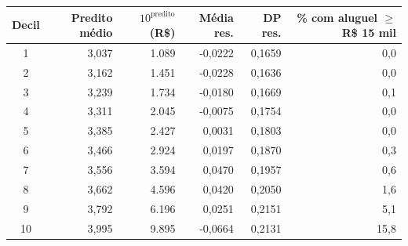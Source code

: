 \begin{tabular}{crrrrr}
\toprule
Decil & Predito médio & $10^{\text{predito}}$ (R\$) & Média res. & DP res. & \% com aluguel $\geq$ R\$ 15 mil \\
\midrule
1 & 3,037 & 1.089 & -0,0222 & 0,1659 & 0,0 \\
2 & 3,162 & 1.451 & -0,0228 & 0,1636 & 0,0 \\
3 & 3,239 & 1.734 & -0,0180 & 0,1669 & 0,1 \\
4 & 3,311 & 2.045 & -0,0075 & 0,1754 & 0,0 \\
5 & 3,385 & 2.427 & 0,0031 & 0,1803 & 0,0 \\
6 & 3,466 & 2.924 & 0,0197 & 0,1870 & 0,3 \\
7 & 3,556 & 3.594 & 0,0470 & 0,1957 & 0,6 \\
8 & 3,662 & 4.596 & 0,0420 & 0,2050 & 1,6 \\
9 & 3,792 & 6.196 & 0,0251 & 0,2151 & 5,1 \\
10 & 3,995 & 9.895 & -0,0664 & 0,2131 & 15,8 \\
\bottomrule
\end{tabular}

